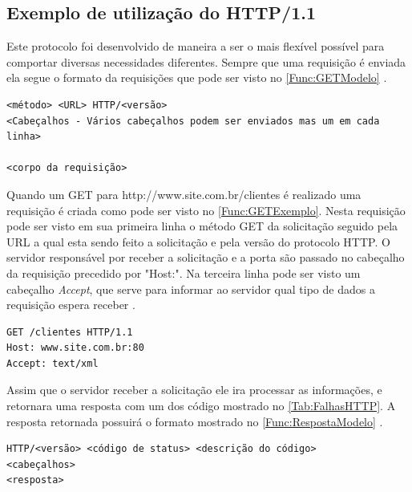 \subsection{Exemplo de utilização do HTTP/1.1} \label{subsec:ExemploHttp}

Este protocolo foi desenvolvido de maneira a ser o mais flexível possível para comportar diversas necessidades diferentes.
Sempre que uma requisição é enviada ela segue o formato da requisições que pode ser visto no \autoref{Func:GETModelo} \cite{Saudate:2014}.

\begin{lstlisting}[label=Func:GETModelo,caption={[Formato de uma requisição HTTP]Formato de uma requisição HTTP}]
<método> <URL> HTTP/<versão>
<Cabeçalhos - Vários cabeçalhos podem ser enviados mas um em cada linha>

<corpo da requisição> 
\end{lstlisting}


Quando um GET para http://www.site.com.br/clientes é realizado uma requisição é criada como pode ser visto no \autoref{Func:GETExemplo}. Nesta requisição pode ser visto em sua primeira linha o método GET da solicitação seguido pela URL a qual esta sendo feito a solicitação e pela versão do protocolo HTTP. O servidor responsável por receber a solicitação e a porta são passado no cabeçalho da requisição precedido por "Host:". Na terceira linha pode ser visto um cabeçalho \textit{Accept}, que serve para informar ao servidor qual tipo de dados a requisição espera receber \cite{Saudate:2014}.


\begin{lstlisting}[label=Func:GETExemplo,caption={[Exemplo de uma requisição HTTP utilizando o método GET.]Exemplo de uma solicitação HTTP utilizando o método GET, para http://www.site.com.br/clientes com o pedido de uma arquivo XML de resposta.}]
GET /clientes HTTP/1.1
Host: www.site.com.br:80
Accept: text/xml
\end{lstlisting}

Assim que o servidor receber a solicitação ele ira processar as informações, e retornara uma resposta com um dos código mostrado no \autoref{Tab:FalhasHTTP}. A resposta retornada possuirá o formato mostrado no \autoref{Func:RespostaModelo} \cite{Saudate:2014}.


\begin{lstlisting}[label=Func:RespostaModelo,caption={[Formato de uma resposta HTTP]Formato de uma resposta HTTP}]
HTTP/<versão> <código de status> <descrição do código>
<cabeçalhos>
<resposta>
\end{lstlisting}


